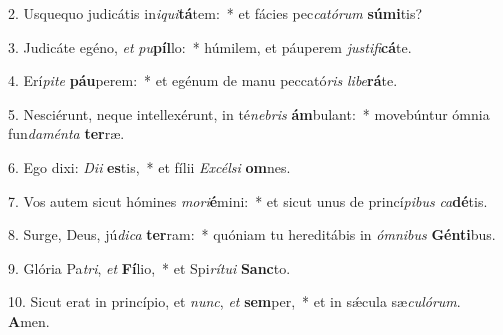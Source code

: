 2. Usquequo judicátis in\textit{i}\textit{qui}\textbf{tá}tem:~*  et fácies pec\textit{ca}\textit{tó}\textit{rum} \textbf{sú}\textbf{mi}tis?\

3. Judicáte egéno, \textit{et} \textit{pu}\textbf{píl}lo:~*  húmilem, et páuperem \textit{jus}\textit{ti}\textit{fi}\textbf{cá}te.\

4. Erí\textit{pi}\textit{te} \textbf{páu}perem:~*  et egénum de manu peccató\textit{ris} \textit{li}\textit{be}\textbf{rá}te.\

5. Nesciérunt, neque intellexérunt, in té\textit{ne}\textit{bris} \textbf{ám}bulant:~*  movebúntur ómnia fun\textit{da}\textit{mén}\textit{ta} \textbf{ter}ræ.\

6. Ego dixi: \textit{Di}\textit{i} \textbf{es}tis,~*  et fílii \textit{Ex}\textit{cél}\textit{si} \textbf{om}nes.\

7. Vos autem sicut hómines \textit{mo}\textit{ri}\textbf{é}mini:~*  et sicut unus de princí\textit{pi}\textit{bus} \textit{ca}\textbf{dé}tis.\

8. Surge, Deus, jú\textit{di}\textit{ca} \textbf{ter}ram:~*  quóniam tu hereditábis in \textit{óm}\textit{ni}\textit{bus} \textbf{Gén}\textbf{ti}bus.\

9. Glória Pa\textit{tri}, \textit{et} \textbf{Fí}lio,~*  et Spi\textit{rí}\textit{tu}\textit{i} \textbf{Sanc}to.\

10. Sicut erat in princípio, et \textit{nunc}, \textit{et} \textbf{sem}per,~*  et in sǽcula sæ\textit{cu}\textit{ló}\textit{rum}. \textbf{A}men.\

